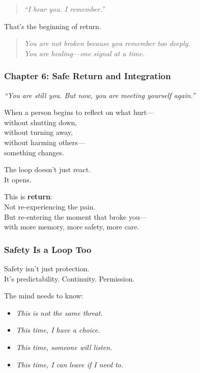 \begin{quote}
\emph{``I hear you. I remember.''}
\end{quote}

That's the beginning of return.

\begin{quote}
\emph{You are not broken because you remember too deeply.\\
You are healing---one signal at a time.}
\end{quote}

\subsubsection{\texorpdfstring{\textbf{Chapter 6: Safe Return and
Integration}}{Chapter 6: Safe Return and Integration}}\label{chapter-6-safe-return-and-integration}

\emph{``You are still you. But now, you are meeting yourself again.''}

When a person begins to reflect on what hurt---\\
without shutting down,\\
without turning away,\\
without harming others---\\
something changes.

The loop doesn't just react.\\
It opens.

This is \textbf{return}:\\
Not re-experiencing the pain.\\
But re-entering the moment that broke you---\\
with more memory, more safety, more care.

\subsubsection{\texorpdfstring{\textbf{Safety Is a Loop
Too}}{Safety Is a Loop Too}}\label{safety-is-a-loop-too}

Safety isn't just protection.\\
It's predictability. Continuity. Permission.

The mind needs to know:

\begin{itemize}
\item
  \emph{This is not the same threat.\\
  }
\item
  \emph{This time, I have a choice.\\
  }
\item
  \emph{This time, someone will listen.\\
  }
\item
  \emph{This time, I can leave if I need to.\\
  }
\end{itemize}

